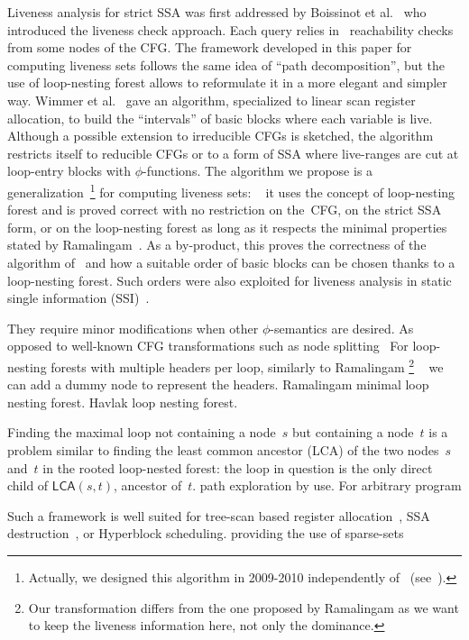 Liveness analysis for strict SSA was first addressed by Boissinot et
al.~\cite{BoissinotHGDR08} who introduced the liveness check approach.
Each query relies in \reduced\ reachability checks from some nodes of the CFG.
The framework developed in this paper for computing liveness sets follows the same idea of ``path decomposition'', but the use of loop-nesting forest allows to reformulate it in a more elegant and simpler way.
Wimmer et al.~\cite{WimmerF10} gave an algorithm, specialized to linear scan
register allocation, to build the ``intervals'' of basic blocks where each
variable is live. Although a possible extension to irreducible CFGs is
sketched, the algorithm restricts itself to reducible CFGs or to a form of SSA
where live-ranges are cut at loop-entry blocks with $\phi$-functions.  The algorithm
we propose is a generalization~\footnote{Actually, we designed this algorithm
  in 2009-2010 independently of~\cite{WimmerF10} (see~\cite{Boissinot10}).} for computing liveness sets: ~\cite{BoissinotHGDR08}
it uses the concept of loop-nesting forest and is proved correct with no
restriction on the~CFG, on the strict SSA form, or on the loop-nesting forest
as long as it respects the minimal properties stated by
Ramalingam~\cite{ramalingam:2002:loopforest:minimal}. As a by-product, this
proves the correctness of the algorithm of~\cite{WimmerF10} and how a suitable
order of basic blocks can be chosen thanks to a loop-nesting forest. Such
orders were also exploited for liveness analysis in static single information
(SSI)~\cite{BoissinotBDR12}.  


They require minor modifications when other $\phi$-semantics are desired.
As opposed to well-known CFG transformations such as node splitting~\cite{JC97,ASU06}
For loop-nesting forests with multiple headers per loop, similarly to Ramalingam%
\footnote{Our transformation differs from the one proposed by Ramalingam as we want to keep the liveness information here, not only the dominance.}%
~\cite{ramalingam:2002:loopforest:minimal} we can add a dummy node to represent the headers.
Ramalingam minimal loop nesting forest. Havlak loop nesting forest.

Finding the maximal loop not containing a node~$s$ but containing a node~$t$ is a problem similar to finding the least common ancestor (LCA) of the two nodes~$s$ and~$t$ in the rooted loop-nested forest:
the loop in question is the only direct child of $\textsf{LCA}(s,t)$, ancestor of~$t$.
path exploration by use. For arbitrary program

Such a framework is well suited for tree-scan based register allocation~\cite{ColombetBBHR11}, SSA destruction~\cite{boissinot:2009:ssadestruction}, or Hyperblock scheduling.
providing the use of sparse-sets~\cite{cooper:2004:engineering}
